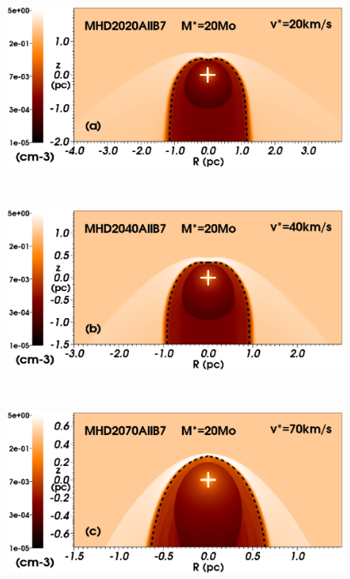 \documentclass[useAMS,usenatbib]{mn2e}
\begin{document}
\begin{figure}
	\begin{minipage}[b]{ 0.48\textwidth}
		\includegraphics[width=1.0\textwidth]{./streamlines_map_20_Mo_20kms_MS_legend.eps}
	\end{minipage} \\
	\begin{minipage}[b]{ 0.48\textwidth}
		\includegraphics[width=1.0\textwidth]{./streamlines_map_20_Mo_40kms_MS_legend.eps}
	\end{minipage} \\
	\begin{minipage}[b]{ 0.48\textwidth}
		\includegraphics[width=1.0\textwidth]{./streamlines_map_20_Mo_70kms_MS_legend.eps}

\end{minipage}
\end{figure}
\end{document}
